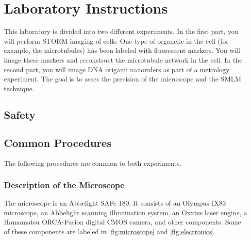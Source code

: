 \documentclass[10pt,a4paper,oneside]{book}
\begin{document}
\chapter{Laboratory Instructions}

This laboratory is divided into two different experiments. In the first part, you will perform STORM imaging of cells. One type of organelle in the cell (for example, the microtubules) has been labeled with fluorescent markers. You will image these markers and reconstruct the microtubule network in the cell. In the second part, you will image DNA origami nanorulers as part of a metrology experiment. The goal is to asses the precision of the microscope and the SMLM technique.

\section{Safety}

\newline

\noindent{}\newline

\section{Common Procedures}

The following procedures are common to both experiments.

\subsection{Description of the Microscope}

The microscope is an Abbelight SAFe 180. It consists of an Olympus IX83 microscope, an Abbelight scanning illumination system, an Oxxius laser engine, a Hamamatsu ORCA-Fusion digital CMOS camera, and other components. Some of these components are labeled in \autoref{fig:microscope} and \autoref{fig:electronics}.
\end{document}
